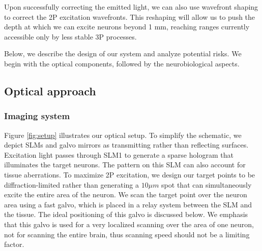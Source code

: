   




Upon successfully correcting the emitted light, we can also use wavefront shaping to correct the 2P excitation wavefronts. This reshaping will allow us to push the depth at which we can excite neurons beyond 1 mm, reaching ranges currently accessible only by less stable 3P processes.



Below, we describe the design of our system and analyze potential risks. We begin with the optical components, followed by the neurobiological aspects.

\subsection{Optical approach}

\subsubsection{Imaging system}
Figure \ref{fig:setup} illustrates our optical setup. To simplify the schematic, we depict SLMs and galvo mirrors as transmitting rather than reflecting surfaces. Excitation light passes through SLM1 to generate a sparse hologram that illuminates the target neurons. The pattern on this SLM can also account for tissue aberrations. To maximize 2P excitation, we design our target points to be diffraction-limited rather than generating a $10\mu m$ spot that can simultaneously excite the entire area of the neuron. We scan the target point over the neuron area using a fast galvo, which is placed in a relay system between the SLM and the tissue. The ideal positioning of this galvo is discussed below. We emphasis that this galvo is used for a very localized scanning over the area of one neuron, not for scanning the entire brain, thus scanning speed should not be a limiting factor. 

